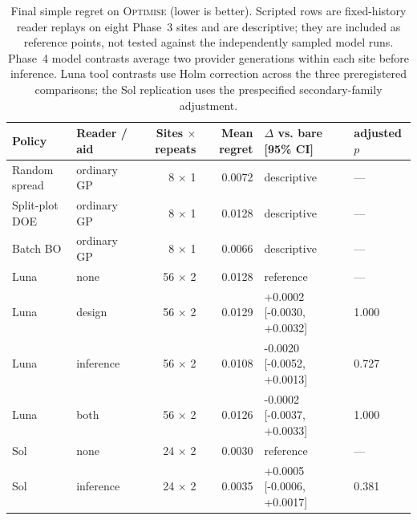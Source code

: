 \begin{table}[t]
\centering\small
\setlength{\tabcolsep}{4.5pt}
\begin{tabular}{@{}llrrll@{}}
\toprule
Policy & Reader / aid & Sites $\times$ repeats & Mean regret & $\Delta$ vs. bare [95\% CI] & adjusted $p$ \\
\midrule
Random spread & ordinary GP & 8 $\times$ 1 & 0.0072 & descriptive & --- \\
Split-plot DOE & ordinary GP & 8 $\times$ 1 & 0.0128 & descriptive & --- \\
Batch BO & ordinary GP & 8 $\times$ 1 & 0.0066 & descriptive & --- \\
\addlinespace
Luna & none & 56 $\times$ 2 & 0.0128 & reference & --- \\
Luna & design & 56 $\times$ 2 & 0.0129 & +0.0002 [-0.0030, +0.0032] & 1.000 \\
Luna & inference & 56 $\times$ 2 & 0.0108 & -0.0020 [-0.0052, +0.0013] & 0.727 \\
Luna & both & 56 $\times$ 2 & 0.0126 & -0.0002 [-0.0037, +0.0033] & 1.000 \\
\addlinespace
Sol & none & 24 $\times$ 2 & 0.0030 & reference & --- \\
Sol & inference & 24 $\times$ 2 & 0.0035 & +0.0005 [-0.0006, +0.0017] & 0.381 \\
\bottomrule
\end{tabular}
\caption{Final simple regret on \textsc{Optimise} (lower is better). Scripted rows are fixed-history reader replays on eight Phase~3 sites and are descriptive; they are included as reference points, not tested against the independently sampled model runs. Phase~4 model contrasts average two provider generations within each site before inference. Luna tool contrasts use Holm correction across the three preregistered comparisons; the Sol replication uses the prespecified secondary-family adjustment.}
\label{tab:phase4-main}
\end{table}
